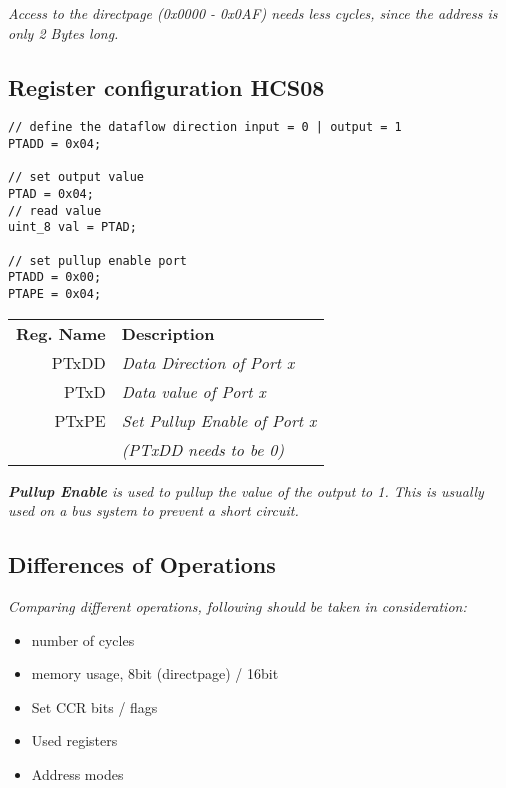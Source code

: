 \textit{
    Access to the directpage (0x0000 - 0x0AF) needs less cycles,
    since the address is only 2 Bytes long.
}

\subsection{Register configuration HCS08}

\begin{lstlisting}
// define the dataflow direction input = 0 | output = 1
PTADD = 0x04;

// set output value
PTAD = 0x04;
// read value
uint_8 val = PTAD;

// set pullup enable port
PTADD = 0x00;
PTAPE = 0x04;
\end{lstlisting}

\begin{tabular}{rl}
    \textbf{Reg. Name} & \textbf{Description} \\
    PTxDD & \textit{Data Direction of Port x} \\
    PTxD  & \textit{Data value of Port x} \\
    PTxPE & \textit{Set Pullup Enable of Port x} \\
          & \textit{(PTxDD needs to be 0)} \\
\end{tabular}

\textit{
    \textbf{Pullup Enable} is used to pullup the value
    of the output to 1. This is usually used on a bus system
    to prevent a short circuit.
}

\subsection{Differences of Operations}

\textit{
    Comparing different operations, following should be taken
    in consideration:
}

\begin{itemize}
    \item{number of cycles}
    \item{memory usage, 8bit (directpage) / 16bit}
    \item{Set CCR bits / flags}
    \item{Used registers}
    \item{Address modes}
\end{itemize}
